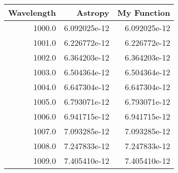 \begin{tabular}{rrr}
\toprule
 Wavelength &      Astropy &  My Function \\
\midrule
     1000.0 & 6.092025e-12 & 6.092025e-12 \\
     1001.0 & 6.226772e-12 & 6.226772e-12 \\
     1002.0 & 6.364203e-12 & 6.364203e-12 \\
     1003.0 & 6.504364e-12 & 6.504364e-12 \\
     1004.0 & 6.647304e-12 & 6.647304e-12 \\
     1005.0 & 6.793071e-12 & 6.793071e-12 \\
     1006.0 & 6.941715e-12 & 6.941715e-12 \\
     1007.0 & 7.093285e-12 & 7.093285e-12 \\
     1008.0 & 7.247833e-12 & 7.247833e-12 \\
     1009.0 & 7.405410e-12 & 7.405410e-12 \\
\bottomrule
\end{tabular}
